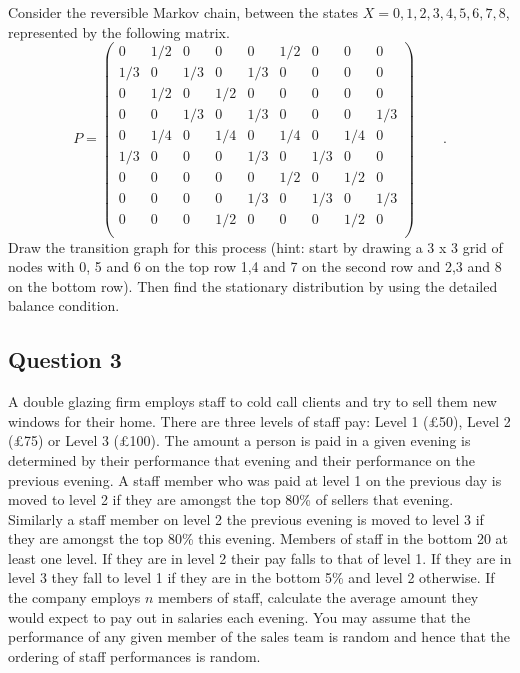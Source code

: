 \documentclass[a4paper]{article}
\begin{document}
Consider the  reversible  Markov chain, between the
states $X=0,1,2,3,4,5,6,7,8$,  represented  by  the following matrix.
$$
P=
\left(
\begin{matrix}
 0 & 1/2 & 0 & 0& 0 & 1/2 & 0 & 0 & 0 \\
 1/3 & 0 & 1/3 & 0 & 1/3 & 0 & 0 & 0 & 0 \\
 0 & 1/2 & 0 & 1/2 & 0 & 0 & 0 & 0 & 0 \\
 0 & 0 & 1/3 & 0 & 1/3 & 0 & 0 & 0 & 1/3\\
 0 & 1/4 & 0 & 1/4 & 0 & 1/4 & 0 & 1/4 & 0\\
 1/3 & 0 & 0 & 0 & 1/3 & 0 &  1/3 & 0 & 0 \\
 0 & 0 & 0 & 0 & 0 & 1/2 & 0 & 1/2 & 0 \\
 0 & 0 & 0 & 0 & 1/3 & 0 & 1/3 & 0 & 1/3\\
 0 & 0 & 0 & 1/2 & 0 & 0 & 0 & 1/2 & 0   \\
\end{matrix}
\right) \qquad .
$$
Draw the transition graph for this process (hint: start by drawing a 3 x 3 grid
of nodes with 0, 5 and 6 on the top row 1,4 and 7 on the second row and 2,3 and
8 on the bottom row).  Then find the stationary distribution by using the detailed
balance condition.

\subsection{Question 3}

A double glazing firm employs staff to cold call clients and try to sell
them new windows for their home. There are three levels of staff pay: Level 1
(£50), Level 2 (£75) or Level 3 (£100).  The amount a
person is paid in a given evening is determined by their performance
that evening and their performance on the previous evening.  A staff member who
was paid at level 1 on the previous day is moved to level 2 if they are
amongst the top 80\% of sellers that evening. Similarly a staff member on level
2 the previous evening is moved to level 3 if they are amongst the top 80\% this evening. Members of staff in the bottom 20%
at least one level.  If they are in level 2 their pay falls to that of
level 1.  If they are in level 3 they fall to level 1 if they are in the bottom
5\% and level 2 otherwise. If the company employs
$n$ members of staff, calculate the average amount they would expect to pay out
in salaries each evening.  You may assume that the performance of any given
member of the sales team is random and hence that the ordering of
staff performances is random.
\end{document}

